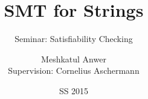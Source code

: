 \documentclass[fleqn]{beamer}
\title{SMT for Strings}
\subtitle{Seminar: Satisfiability Checking}
\author[Meshkatul Anwer]{Meshkatul Anwer\\ \small{Supervision: Cornelius Aschermann}}
\institute[THS]{}
\date{SS 2015}
\begin{document}
\frame{\titlepage}%











\end{document}

